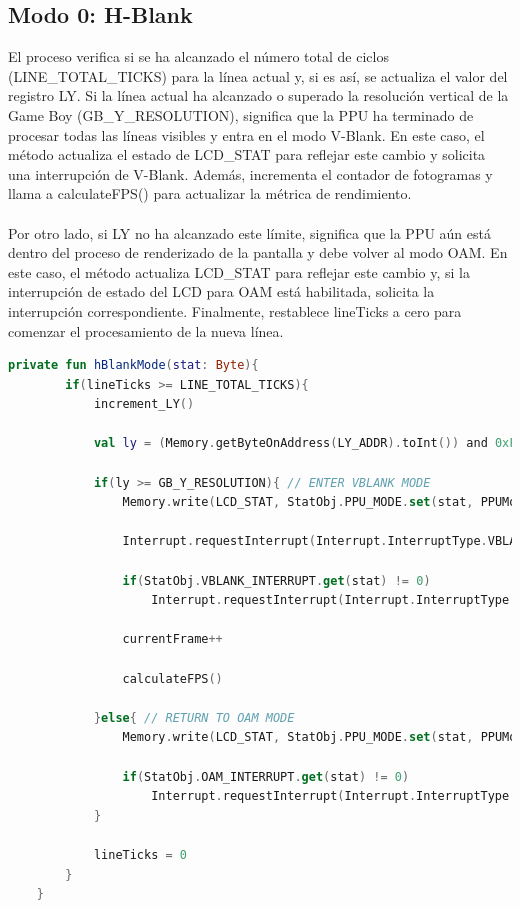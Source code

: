 \subsection{Modo 0: H-Blank}

El proceso verifica si se ha alcanzado el número total de ciclos (LINE\_TOTAL\_TICKS) para la línea actual y, si es así, se actualiza el valor del registro LY. Si la línea actual ha alcanzado o superado la resolución vertical de la Game Boy (GB\_Y\_RESOLUTION), significa que la PPU ha terminado de procesar todas las líneas visibles y entra en el modo V-Blank. En este caso, el método actualiza el estado de LCD\_STAT para reflejar este cambio y solicita una interrupción de V-Blank. Además, incrementa el contador de fotogramas y llama a calculateFPS() para actualizar la métrica de rendimiento.
\\\\
Por otro lado, si LY no ha alcanzado este límite, significa que la PPU aún está dentro del proceso de renderizado de la pantalla y debe volver al modo OAM. En este caso, el método actualiza LCD\_STAT para reflejar este cambio y, si la interrupción de estado del LCD para OAM está habilitada, solicita la interrupción correspondiente. Finalmente, restablece lineTicks a cero para comenzar el procesamiento de la nueva línea.

\begin{lstlisting}[language=Kotlin, caption={Lógica del proceso de H-Blank.}, label={code:ppuhblank}]
    private fun hBlankMode(stat: Byte){
        if(lineTicks >= LINE_TOTAL_TICKS){
            increment_LY()

            val ly = (Memory.getByteOnAddress(LY_ADDR).toInt()) and 0xFF

            if(ly >= GB_Y_RESOLUTION){ // ENTER VBLANK MODE
                Memory.write(LCD_STAT, StatObj.PPU_MODE.set(stat, PPUMode.VBlank.number))

                Interrupt.requestInterrupt(Interrupt.InterruptType.VBLANK.getByteMask()) // ASK FOR VBLANK INTERRUPT

                if(StatObj.VBLANK_INTERRUPT.get(stat) != 0)
                    Interrupt.requestInterrupt(Interrupt.InterruptType.LCD_STAT.getByteMask()) // ASK FOR LCD STAT INTERRUPT IF LCD_STAT HAS THE VBLANK BIT ACTIVATED

                currentFrame++

                calculateFPS()

            }else{ // RETURN TO OAM MODE
                Memory.write(LCD_STAT, StatObj.PPU_MODE.set(stat, PPUMode.OAM.number))

                if(StatObj.OAM_INTERRUPT.get(stat) != 0)
                    Interrupt.requestInterrupt(Interrupt.InterruptType.LCD_STAT.getByteMask()) // ASK FOR LCD STAT INTERRUPT IF LCD_STAT HAS THE OAM BIT ACTIVATED
            }

            lineTicks = 0
        }
    }
\end{lstlisting}


